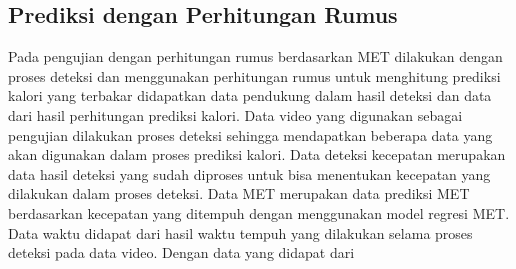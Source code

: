 \subsection{Prediksi dengan Perhitungan Rumus}
\label{subsec:PengujianPrediksiPerhitungan}



Pada pengujian dengan perhitungan rumus berdasarkan MET dilakukan dengan proses deteksi dan menggunakan perhitungan rumus untuk menghitung prediksi kalori yang terbakar didapatkan data pendukung dalam hasil deteksi dan data dari hasil perhitungan prediksi kalori. Data video yang digunakan sebagai pengujian dilakukan proses deteksi sehingga mendapatkan beberapa data yang akan digunakan dalam proses prediksi kalori. Data deteksi kecepatan merupakan data hasil deteksi yang sudah diproses untuk bisa menentukan kecepatan yang dilakukan dalam proses deteksi. Data MET merupakan 
data prediksi MET berdasarkan kecepatan yang ditempuh dengan menggunakan model regresi MET. Data waktu didapat dari hasil waktu tempuh yang dilakukan selama proses deteksi pada data video. Dengan data yang didapat dari

